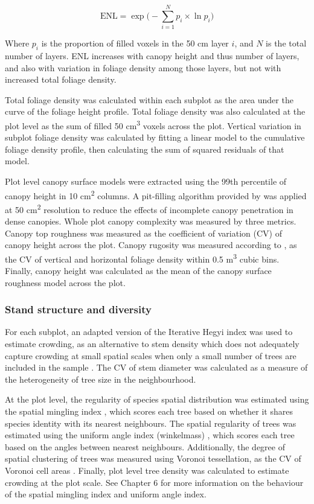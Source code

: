 \documentclass[11pt,a4paper]{article}
\begin{document}
\begin{equation}
	\text{ENL} = \exp\Big(-\sum_{i=1}^{N} p_{i} \times \ln p_{i} \Big)
\end{equation}

Where $p_{i}$ is the proportion of filled voxels in the 50 cm layer $i$, and $N$ is the total number of layers. ENL increases with canopy height and thus number of layers, and also with variation in foliage density among those layers, but not with increased total foliage density.

Total foliage density was calculated within each subplot as the area under the curve of the foliage height profile. Total foliage density was also calculated at the plot level as the sum of filled 50 cm\textsuperscript{3} voxels across the plot. Vertical variation in subplot foliage density was calculated by fitting a linear model to the cumulative foliage density profile, then calculating the sum of squared residuals of that model. 

Plot level canopy surface models were extracted using the 99th percentile of canopy height in 10 cm\textsuperscript{2} columns. A pit-filling algorithm provided by \citet{Khosravipour2014} was applied at 50 cm\textsuperscript{2} resolution to reduce the effects of incomplete canopy penetration in dense canopies. Whole plot canopy complexity was measured by three metrics. Canopy top roughness was measured as the coefficient of variation (CV) of canopy height across the plot. Canopy rugosity was measured according to \citet{Hardiman2011}, as the CV of vertical and horizontal foliage density within 0.5 m\textsuperscript{3} cubic bins. Finally, canopy height was calculated as the mean of the canopy surface roughness model across the plot.

\subsubsection{Stand structure and diversity}

For each subplot, an adapted version of the Iterative Hegyi index was used to estimate crowding, as an alternative to stem density which does not adequately capture crowding at small spatial scales when only a small number of trees are included in the sample \citep{Hegyi1974}. The CV of stem diameter was calculated as a measure of the heterogeneity of tree size in the neighbourhood. 

At the plot level, the regularity of species spatial distribution was estimated using the spatial mingling index \citep{Gadow2002}, which scores each tree based on whether it shares species identity with its nearest neighbours. The spatial regularity of trees was estimated using the uniform angle index (winkelmass) \citep{Gadow2002}, which scores each tree based on the angles between nearest neighbours. Additionally, the degree of spatial clustering of trees was measured using Voronoi tessellation, as the CV of Voronoi cell areas \citep{Ong2012}. Finally, plot level tree density was calculated to estimate crowding at the plot scale. See Chapter 6 for more information on the behaviour of the spatial mingling index and uniform angle index.
\end{document}
